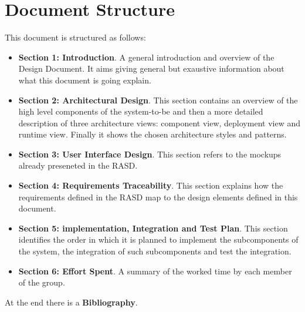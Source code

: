 \section{Document Structure}
This document is structured as follows:
\begin{itemize}
  \setlength{\itemindent}{-.4in}
  \item[] \textbf{Section 1: Introduction}. A general introduction and overview of the Design Document. It aims giving general but exaustive information about what this document is going explain.
  \item[] \textbf{Section 2: Architectural Design}. This section contains an overview of the high level components of the system-to-be and then a more detailed description of three architecture views: component view, deployment view and runtime view. Finally it shows the chosen architecture styles and patterns.
  \item[] \textbf{Section 3: User Interface Design}. This section refers to the mockups already preseneted in the RASD.
  \item[] \textbf{Section 4: Requirements Traceability}. This section explains how the requirements defined in the RASD map to the design elements defined in this document.
  \item[] \textbf{Section 5: implementation, Integration and Test Plan}. This section identifies the order in which it is planned to implement the subcomponents of the system, the integration of such subcomponents and test the integration.
  \item[] \textbf{Section 6: Effort Spent}. A summary of the worked time by each member of the group.
\end{itemize}
At the end there is a \textbf{Bibliography}.
